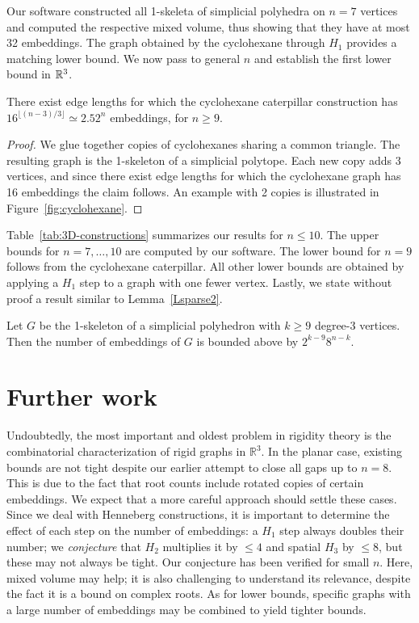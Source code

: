 \documentclass[envcountsame]{llncs}
\begin{document}
Our software constructed all 1-skeleta of simplicial polyhedra on $n= 7$ vertices
and computed the respective mixed volume, thus showing that they have at most 32 embeddings.
The graph obtained by the cyclohexane through $H_1$ provides a matching lower bound.
\fi
We now pass to general $n$ and establish the first  lower bound in ${\mathbb R}^3$.

\begin{theorem}\label{Tcyclocaterp}
There exist edge lengths for which the cyclohexane caterpillar
  construction has $16^{\lfloor (n-3)/3 \rfloor} \simeq 2.52^n$ embeddings, for $ n\ge 9$.
\end{theorem}
\begin{proof}
  We glue together copies of cyclohexanes sharing a common triangle.   The resulting graph is the 1-skeleton of a simplicial polytope. Each new copy adds 3 vertices,
and since there exist edge lengths for which the cyclohexane graph has  16 embeddings the claim follows.  An example with 2 copies is illustrated in Figure~\ref{fig:cyclohexane}.

\end{proof}

Table~\ref{tab:3D-constructions} summarizes our results for $n \le 10$.
The upper bounds for $n=7,\dots,10$ are computed by our software.
The lower bound for $n=9$ follows from the cyclohexane caterpillar.
All  other lower bounds are 
obtained by applying a $H_1$ step to a graph with one fewer vertex.
Lastly, we state without proof  a result similar to Lemma~\ref{Lsparse2}. 

\begin{lemma}\label{Lsparse3}
  Let $G$ be the 1-skeleton of a simplicial polyhedron with $k \ge 9$ 
  degree-3 vertices.
  Then the number of embeddings of $G$ is bounded above by $2^{k-9}  8^{n-k}$.
\end{lemma}


\section{Further work}

Undoubtedly, the most important and oldest problem in rigidity theory
is the combinatorial characterization of rigid graphs in $\mathbb{R}^3$.
In the planar case, existing bounds are not tight despite our earlier
attempt to close all gaps up to $n=8$. This is due to the fact that
root counts include rotated copies of certain embeddings. We expect
that a more careful approach should settle these cases.
Since we deal with Henneberg constructions,
it is important to determine the effect of each step on the number of embeddings:
a $H_1$ step always doubles their number;
we {\em conjecture} that $H_2$ multiplies it by $\le 4$ and spatial $H_3$ by $\le 8$,
but these may not always be tight.
Our conjecture has been verified for small $n$.
Here, mixed volume may help; it is also challenging to understand
its relevance, despite the fact it is a bound on complex roots.
As for lower bounds, specific graphs with a large number of
embeddings may be combined to yield tighter bounds.
\end{document}
